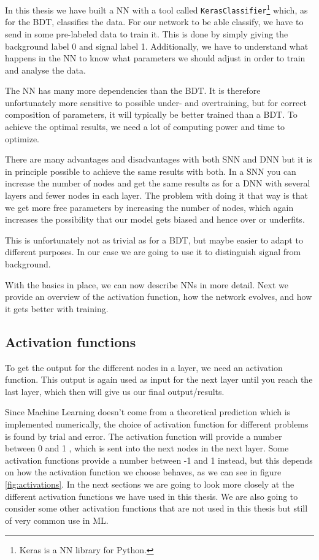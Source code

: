 In this thesis we have built a NN with a tool called \texttt{KerasClassifier}\footnote{Keras \cite{keras} is a NN library for Python.} which, as for the BDT, classifies the data. For our network to be able classify, we have to send in some pre-labeled data to train it. This is done by simply giving the background label 0 and signal label 1. Additionally, we have to understand what happens in the NN to know what parameters we should adjust in order to train and analyse the data. 

The NN has many more dependencies than the BDT. It is therefore unfortunately more sensitive to possible under- and overtraining, but for correct composition of parameters, it will typically be better trained than a BDT. To achieve the optimal results, we need a lot of computing power and time to optimize. 

There are many advantages and disadvantages with both SNN and DNN but it is in principle possible to achieve the same results with both. In a SNN you can increase the number of nodes and get the same results as for a DNN with several layers and fewer nodes in each layer. The problem with doing it that way is that we get more free parameters by increasing the number of nodes, which again increases the possibility that our model gets biased and hence over or underfits.

This is unfortunately not as trivial as for a BDT, but maybe easier to adapt to different purposes. In our case we are going to use it to distinguish signal from background.

With the basics in place, we can now describe NNs in more detail. Next we provide an overview of the activation function, how the network evolves, and how it gets better with training.

\subsection{Activation functions}
To get the output for the different nodes in a layer, we need an activation function. This output is again used as input for the next layer until you reach the last layer, which then will give us our final output/results.

Since Machine Learning doesn't come from a theoretical prediction which is implemented numerically, the choice of activation function for different problems is found by trial and error. The activation function will provide a number between 0 and 1 \cite{AF}, which is sent into the next nodes in the next layer. Some activation functions provide a number between -1 and 1 instead, but this depends on how the activation function we choose behaves, as we can see in figure \ref{fig:activations}. In the next sections we are going to look more closely at the different activation functions we have used in this thesis. We are also going to consider some other activation functions that are not used in this thesis but still of very common use in ML.


